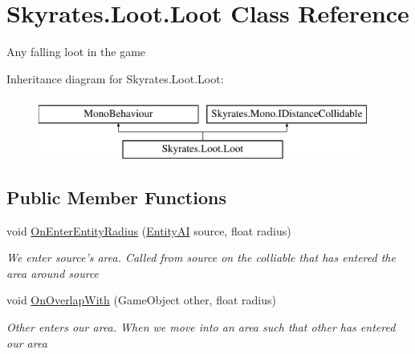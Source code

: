 \hypertarget{class_skyrates_1_1_loot_1_1_loot}{\section{Skyrates.\-Loot.\-Loot Class Reference}
\label{class_skyrates_1_1_loot_1_1_loot}
}


Any falling loot in the game  


Inheritance diagram for Skyrates.\-Loot.\-Loot\-:\begin{figure}[H]
\begin{center}
\leavevmode
\includegraphics[height=2.000000cm]{class_skyrates_1_1_loot_1_1_loot}
\end{center}
\end{figure}
\subsection*{Public Member Functions}
\begin{DoxyCompactItemize}
\item 
void \hyperlink{class_skyrates_1_1_loot_1_1_loot_a85d78f74c6297f83b60fbfadeecf7ce4}{On\-Enter\-Entity\-Radius} (\hyperlink{class_skyrates_1_1_entity_1_1_entity_a_i}{Entity\-A\-I} source, float radius)
\begin{DoxyCompactList}\small\item\em We enter source's area. Called from source on the colliable that has entered the area around source \end{DoxyCompactList}\item 
void \hyperlink{class_skyrates_1_1_loot_1_1_loot_a622463b31bab8becf2c286dd2bf9df1a}{On\-Overlap\-With} (Game\-Object other, float radius)
\begin{DoxyCompactList}\small\item\em Other enters our area. When we move into an area such that other has entered our area \end{DoxyCompactList}\end{DoxyCompactItemize}
